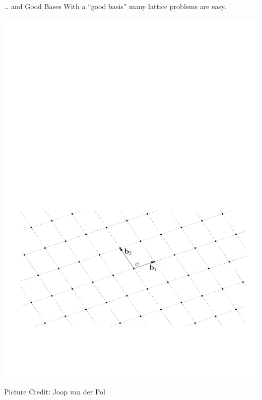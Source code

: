 \documentclass[xcolor=table,10pt,aspectratio=169]{beamer}
\begin{document}
\begin{frame}[label={sec:org158f189}]{… and Good Bases}
With a “good basis” many lattice problems are easy.

\begin{center}
\includegraphics[width=0.8\linewidth]{./joop-latt1.pdf}
\end{center}

\tiny Picture Credit: Joop van der Pol
\end{frame}
\end{document}
